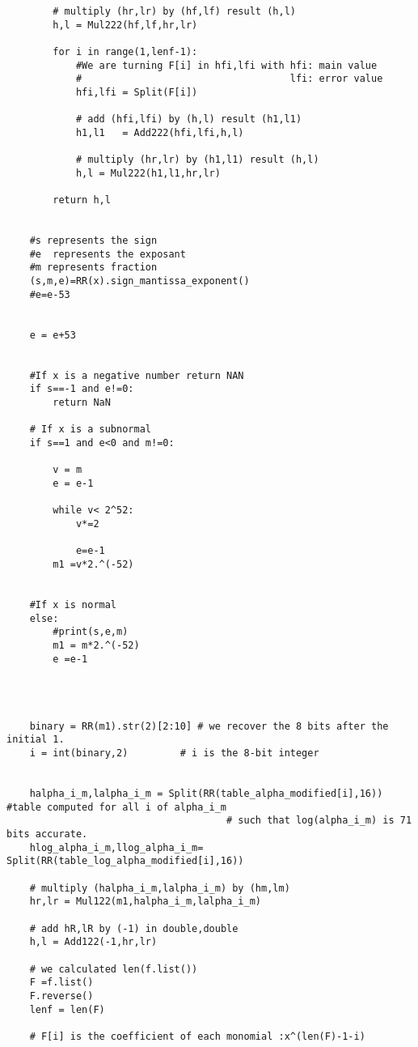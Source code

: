 \begin{lstlisting}
        # multiply (hr,lr) by (hf,lf) result (h,l)
        h,l = Mul222(hf,lf,hr,lr)
        
        for i in range(1,lenf-1):
            #We are turning F[i] in hfi,lfi with hfi: main value
            #                                    lfi: error value
            hfi,lfi = Split(F[i])

            # add (hfi,lfi) by (h,l) result (h1,l1)
            h1,l1   = Add222(hfi,lfi,h,l)

            # multiply (hr,lr) by (h1,l1) result (h,l)
            h,l = Mul222(h1,l1,hr,lr)
            
        return h,l


    #s represents the sign 
    #e  represents the exposant 
    #m represents fraction
    (s,m,e)=RR(x).sign_mantissa_exponent()
    #e=e-53 
    
    
    e = e+53
    
    
    #If x is a negative number return NAN
    if s==-1 and e!=0:                   
        return NaN
    
    # If x is a subnormal
    if s==1 and e<0 and m!=0:
        
        v = m
        e = e-1
        
        while v< 2^52:
            v*=2
            
            e=e-1
        m1 =v*2.^(-52)
        

    #If x is normal
    else:
        #print(s,e,m)
        m1 = m*2.^(-52)
        e =e-1
    
    
    
    
    binary = RR(m1).str(2)[2:10] # we recover the 8 bits after the initial 1.
    i = int(binary,2)         # i is the 8-bit integer
    
    
    halpha_i_m,lalpha_i_m = Split(RR(table_alpha_modified[i],16)) #table computed for all i of alpha_i_m
                                      # such that log(alpha_i_m) is 71 bits accurate.
    hlog_alpha_i_m,llog_alpha_i_m= Split(RR(table_log_alpha_modified[i],16)) 
    
    # multiply (halpha_i_m,lalpha_i_m) by (hm,lm)
    hr,lr = Mul122(m1,halpha_i_m,lalpha_i_m)
    
    # add hR,lR by (-1) in double,double
    h,l = Add122(-1,hr,lr)
    
    # we calculated len(f.list())
    F =f.list()
    F.reverse()
    lenf = len(F)

    # F[i] is the coefficient of each monomial :x^(len(F)-1-i)
    

\end{lstlisting}
